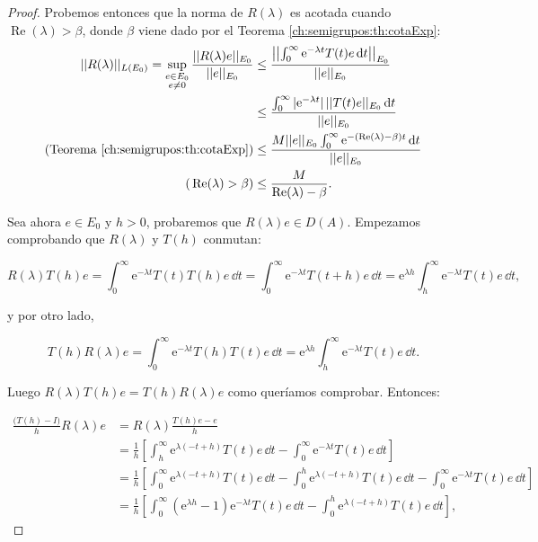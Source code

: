 \begin{proof}
    Probemos entonces que la norma de $R(\lambda)$ es acotada cuando $\operatorname{Re}(\lambda) > \beta$, donde $\beta$ viene dado por el Teorema \ref{ch:semigrupos:th:cotaExp}:
    \begin{align*}
        ||R(\lambda)||_{L(E_0)} = \sup_{\substack{e \in E_0 \\ e \neq 0}} \frac{||R(\lambda)e||_{E_0}}{||e||_{E_0}} &\leq \frac{\left | \left | \int_0^{\infty}\mathrm{e}^{-\lambda t}T(t)e \, \mathrm{d} t \right | \right |_{E_0}}{||e||_{E_0}}\\
        &\leq \frac{\int_0^{\infty}|\mathrm{e}^{-\lambda t}| \, ||T(t)e||_{E_0} \, \mathrm{d} t}{||e||_{E_0}}\\
        \text{(Teorema \ref{ch:semigrupos:th:cotaExp})}&\leq \frac{M ||e||_{E_0} \int_0^\infty \mathrm{e}^{-(\operatorname{Re}(\lambda) - \beta)t} \, \mathrm{d} t}{||e||_{E_0}}\\
        \text{(}\operatorname{Re}(\lambda) > \beta\text{)}&\leq \frac{M}{\operatorname{Re}(\lambda) - \beta}.
    \end{align*}

    Sea ahora $e \in E_0$ y $h>0$, probaremos que $R(\lambda)e \in D(A)$. Empezamos comprobando que $R(\lambda)$ y $T(h)$ conmutan:

    \[R(\lambda)T(h)e = \int_0^\infty\mathrm{e}^{-\lambda t}T(t)T(h)e \, \dd t = \int_0^\infty\mathrm{e}^{-\lambda t}T(t + h)e \, \dd t = \mathrm{e}^{\lambda h} \int_h^\infty \mathrm{e}^{-\lambda t} T(t)e \, \dd t,\]

    y por otro lado,

    \[T(h)R(\lambda)e = \int_0^\infty \mathrm{e}^{-\lambda t}T(h)T(t)e \, \dd t = \mathrm{e}^{\lambda h} \int_h^\infty \mathrm{e}^{-\lambda t} T(t)e \, \dd t.\]

    Luego $R(\lambda)T(h)e = T(h)R(\lambda)e$ como queríamos comprobar. Entonces:

    \begin{align*}
        \frac{\big(T(h) - I\big)}{h}R(\lambda)e &= R(\lambda)\frac{T(h)e - e}{h}\\
        &=\frac{1}{h}\left [\int_h^\infty \mathrm{e}^{\lambda(-t + h)}T(t)e \, \dd t - \int_0^\infty\mathrm{e}^{-\lambda t}T(t)e \, \dd t \right ]\\
        &=\frac{1}{h}\left [\int_0^\infty \mathrm{e}^{\lambda(-t + h)}T(t)e \, \dd t - \int_0^h \mathrm{e}^{\lambda(-t + h)}T(t)e \, \dd t - \int_0^\infty\mathrm{e}^{-\lambda t}T(t)e \, \dd t \right ]\\
        &=\frac{1}{h}\left[\int_0^\infty (\mathrm{e}^{\lambda h} - 1) \mathrm{e}^{-\lambda t}T(t)e \, \dd t - \int_0^h\mathrm{e}^{\lambda(-t + h)}T(t)e \, \dd t\right],
    \end{align*}


\end{proof}
